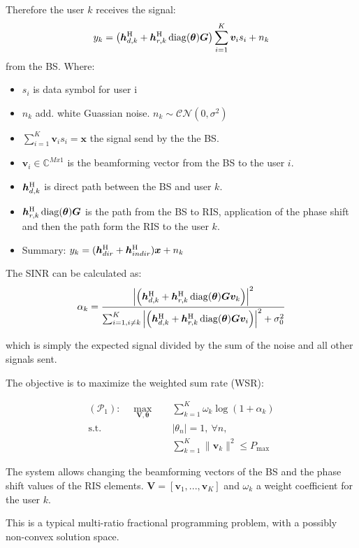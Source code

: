Therefore the user $k$ receives the signal:
\begin{equation}
    y_k = \left(\bm{h}_{d,k}^{\mathrm{H}} + \bm{h}_{r,k}^{\mathrm{H}} \operatorname{diag}(\bm{\theta}) \bm{G}\right) \sum_{i = 1}^{K} \bm{v}_i s_i + n_k
\end{equation}
from the BS.
Where:
\begin{itemize}
    \item $s_i$ is data symbol for user i
    \item $n_k$ add. white Guassian noise. $n_k \sim \mathcal{CN}(0, \sigma^2)$
    \item $\sum_{i = 1}^{K} \bm{v}_i s_i = \bm{x}$ the signal send by the the BS.
    \item $\bm{v}_i \in \mathbb{C}^{M x 1}$ is the beamforming vector from the BS to the user $i$.
    \item $\bm{h}_{d,k}^{\mathrm{H}}$ is direct path between the BS and user $k$.
    \item $\bm{h}_{r,k}^{\mathrm{H}} \operatorname{diag}(\bm{\theta}) \bm{G}$ is the path from the BS to RIS, application of the phase shift and then the path form the RIS to the user $k$.
    \item Summary: $y_k = (\bm{h}_{dir}^{\mathrm{H}} + \bm{h}_{indir}^{\mathrm{H}}) \bm{x} + n_k$
\end{itemize}

The SINR can be calculated as:
\begin{equation}
    \alpha_k = \frac{\left|\left(\bm{h}_{d,k}^{\mathrm{H}} + \bm{h}_{r,k}^{\mathrm{H}} \operatorname{diag}(\bm{\theta}) \bm{G}\bm{v}_k\right)\right|^2}{\sum_{i=1, i \ne k}^{K}\left|\left(\bm{h}_{d,k}^{\mathrm{H}} + \bm{h}_{r,k}^{\mathrm{H}} \operatorname{diag}(\bm{\theta}) \bm{G}\bm{v}_i\right)\right|^2 + \sigma_0^2}
\end{equation}

which is simply the expected signal divided by the sum of the noise and all other signals sent.


The objective is to maximize the weighted sum rate (WSR):

\begin{align}
    (\mathcal{P}_1): \quad 
    \max_{\mathbf{V}, \bm{\theta}} \quad 
    & \sum_{k=1}^{K} \omega_k \log(1 + \alpha_k) \\
    \text{s.t.} \quad 
    & |\theta_n| = 1, \ \forall n, \label{eq:theta_constraint} \\
    & \sum_{k=1}^{K} \|\bm{v}_k\|^2 \le P_{\max}
\end{align}

The system allows changing the beamforming vectors of the BS and the phase shift values of the RIS elements.
$\bm{V} = [\bm{v}_1, ..., \bm{v}_K]$ and $\omega_k$ a weight coefficient for the user $k$.

This is a typical multi-ratio fractional programming problem, with a possibly non-convex solution space.